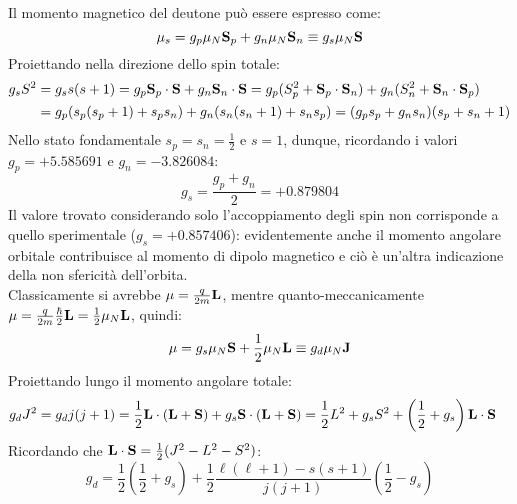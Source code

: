 Il momento magnetico del deutone può essere espresso come:
\begin{equation}
	\mathbf{\mu}_s = g_p \mu_N \mathbf{S}_p + g_n \mu_N \mathbf{S}_n \equiv g_s \mu_N \mathbf{S}
	\label{eq:4.11}
\end{equation}
Proiettando nella direzione dello spin totale:
\begin{equation*}
	\begin{split}
		g_s S^2
		&= g_s s (s + 1) = g_p \mathbf{S}_p \cdot \mathbf{S} + g_n \mathbf{S}_n \cdot \mathbf{S} = g_p (S_p^2 + \mathbf{S}_p \cdot \mathbf{S}_n) + g_n (S_n^2 + \mathbf{S}_n \cdot \mathbf{S}_p)\\
		&= g_p (s_p (s_p + 1) + s_p s_n) + g_n (s_n (s_n + 1) + s_n s_p) = (g_p s_p + g_n s_n) (s_p + s_n + 1)
	\end{split}
\end{equation*}
Nello stato fondamentale $ s_p = s_n = \frac{1}{2} $ e $ s = 1 $, dunque, ricordando i valori $ g_p = +5.585691 $ e $ g_n = -3.826084 $:
\begin{equation}
	g_s = \frac{g_p + g_n}{2} = +0.879804
	\label{eq:4.12}
\end{equation}
Il valore trovato considerando solo l'accoppiamento degli spin non corrisponde a quello sperimentale ($ g_s = +0.857406 $): evidentemente anche il momento angolare orbitale contribuisce al momento di dipolo magnetico e ciò è un'altra indicazione della non sfericità dell'orbita.\\
Classicamente si avrebbe $ \mathbf{\mu} = \frac{q}{2m} \mathbf{L} $, mentre quanto-meccanicamente $ \mathbf{\mu} = \frac{q}{2m} \frac{\hbar}{2} \mathbf{L} = \frac{1}{2} \mu_N \mathbf{L} $, quindi:
\begin{equation}
	\mathbf{\mu} = g_s \mu_N \mathbf{S} + \frac{1}{2} \mu_N \mathbf{L} \equiv g_d \mu_N \mathbf{J}
	\label{eq:4.13}
\end{equation}
Proiettando lungo il momento angolare totale:
\begin{equation*}
	\begin{split}
		g_d J^2
		&= g_d j (j + 1) = \frac{1}{2} \mathbf{L} \cdot (\mathbf{L} + \mathbf{S}) + g_s \mathbf{S} \cdot (\mathbf{L} + \mathbf{S}) = \frac{1}{2} L^2 + g_s S^2 + \left( \frac{1}{2} + g_s \right) \mathbf{L} \cdot \mathbf{S}
	\end{split}
\end{equation*}
Ricordando che $ \mathbf{L}\cdot\mathbf{S} = \frac{1}{2} (J^2 - L^2 - S^2) $:
\begin{equation}
	g_d = \frac{1}{2} \left( \frac{1}{2} + g_s \right) + \frac{1}{2} \frac{\ell (\ell + 1) - s (s + 1)}{j (j + 1)} \left( \frac{1}{2} - g_s \right)
	\label{eq:4.14}
\end{equation}
